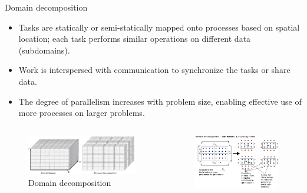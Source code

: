 \documentclass[10pt,times]{beamer}
\begin{document}
\begin{frame}{Domain decomposition}
\begin{itemize}
\item Tasks are statically or semi-statically mapped onto processes based on spatial 
location; each task performs similar operations on different data (subdomains).
\item Work is interspersed with communication to synchronize the tasks or share data.
\item The degree of parallelism increases with problem size, enabling effective use 
of more processes on larger problems.
\end{itemize}
\begin{columns}
\begin{figure}
\includegraphics[width=\linewidth]{figs/decomp_3D.png}
\caption*{Domain decomposition}
\end{figure}
\begin{figure}
\includegraphics[width=\linewidth]{figs/domain_decomposition.png}
\end{figure}

\end{columns}
\end{frame}
\end{document}
